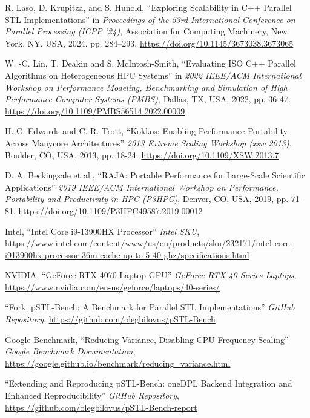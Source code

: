 \documentclass[sigconf]{acmart}
\begin{document}
\balance{}

\begin{thebibliography}{1}

      R. Laso, D. Krupitza, and S. Hunold, ``Exploring Scalability in C++ Parallel STL Implementations'' in \textit{Proceedings of the 53rd International Conference on Parallel Processing (ICPP '24)},
      Association for Computing Machinery, New York, NY, USA, 2024, pp. 284--293.
      \url{https://doi.org/10.1145/3673038.3673065}

      W. -C. Lin, T. Deakin and S. McIntosh-Smith, ``Evaluating ISO C++ Parallel Algorithms on Heterogeneous HPC Systems'' in  \textit{2022 IEEE/ACM International Workshop on Performance Modeling, Benchmarking and Simulation of High Performance Computer Systems (PMBS)},
      Dallas, TX, USA, 2022, pp. 36-47.
      \url{https://doi.org/10.1109/PMBS56514.2022.00009}

      H. C. Edwards and C. R. Trott, ``Kokkos: Enabling Performance Portability Across Manycore Architectures'' \textit{2013 Extreme Scaling Workshop (xsw 2013)},
      Boulder, CO, USA, 2013, pp. 18-24.
      \url{https://doi.org/10.1109/XSW.2013.7}

      D. A. Beckingsale et al., ``RAJA: Portable Performance for Large-Scale Scientific Applications'' \textit{2019 IEEE/ACM International Workshop on Performance, Portability and Productivity in HPC (P3HPC)},
      Denver, CO, USA, 2019, pp. 71-81.
      \url{https://doi.org/10.1109/P3HPC49587.2019.00012}

      Intel, ``Intel Core i9-13900HX Processor'' \textit{Intel SKU},
      \url{https://www.intel.com/content/www/us/en/products/sku/232171/intel-core-i913900hx-processor-36m-cache-up-to-5-40-ghz/specifications.html}

      NVIDIA, ``GeForce RTX 4070 Laptop GPU'' \textit{GeForce RTX 40 Series Laptops},
      \url{https://www.nvidia.com/en-us/geforce/laptops/40-series/}

      ``Fork: pSTL-Bench: A Benchmark for Parallel STL Implementations'' \textit{GitHub Repository},
      \url{https://github.com/olegbilovus/pSTL-Bench}

      Google Benchmark, ``Reducing Variance, Disabling CPU Frequency Scaling'' \textit{Google Benchmark Documentation},
      \url{https://google.github.io/benchmark/reducing_variance.html}

      ``Extending and Reproducing pSTL-Bench: oneDPL Backend Integration and Enhanced Reproducibility'' \textit{GitHub Repository},
      \url{https://github.com/olegbilovus/pSTL-Bench-report}

\end{thebibliography}
\end{document}
